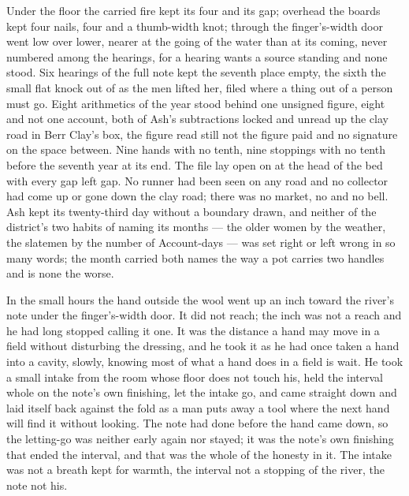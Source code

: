 Under the floor the carried fire kept its four and its gap; overhead the boards kept four nails, four and a thumb-width knot; through the finger's-width door  went low over lower, nearer at the going of the water than at its coming, never numbered among the hearings, for a hearing wants a source standing and none stood. Six hearings of the full note kept the seventh place empty, the sixth the small flat knock out of  as the men lifted her, filed where a thing out of a person must go. Eight arithmetics of the year stood behind one unsigned figure, eight and not one account, both of Ash's subtractions locked and unread up the clay road in Berr Clay's box, the figure read still not the figure paid and no signature on the space between. Nine hands with no tenth, nine stoppings with no tenth before the seventh year at its end. The file lay open on  at the head of the bed with every gap left gap. No runner had been seen on any road and no collector had come up or gone down the clay road; there was no market, no  and no bell. Ash kept its twenty-third day without a boundary drawn, and neither of the district's two habits of naming its months --- the older women by the weather, the slatemen by the number of Account-days --- was set right or left wrong in so many words; the month carried both names the way a pot carries two handles and is none the worse.

\scenebreak

In the small hours the hand outside the wool went up an inch toward the river's note under the finger's-width door. It did not reach; the inch was not a reach and he had long stopped calling it one. It was the distance a hand may move in a field without disturbing the dressing, and he took it as he had once taken a hand into a cavity, slowly, knowing most of what a hand does in a field is wait. He took a small intake from the room whose floor does not touch his, held the interval whole on the note's own finishing, let the intake go, and came straight down and laid itself back against the fold as a man puts away a tool where the next hand will find it without looking. The note had done before the hand came down, so the letting-go was neither early again nor stayed; it was the note's own finishing that ended the interval, and that was the whole of the honesty in it. The intake was not a breath kept for warmth, the interval not a stopping of the river, the note not his.

